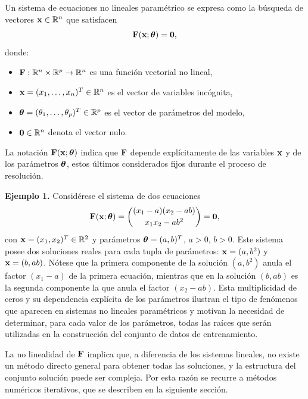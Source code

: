Un sistema de ecuaciones no lineales paramétrico se expresa como la búsqueda de vectores \(\mathbf{x} \in \mathbb{R}^n\) que satisfacen \begin{equation} \mathbf{F}(\mathbf{x}; \boldsymbol{\theta}) = \mathbf{0}, \label{eq:sistema_general} \end{equation} donde: \begin{itemize} \item \(\mathbf{F}: \mathbb{R}^n \times \mathbb{R}^p \to \mathbb{R}^n\) es una función vectorial no lineal, \item \(\mathbf{x} = (x_1, \dots, x_n)^T \in \mathbb{R}^n\) es el vector de variables incógnita, \item \(\boldsymbol{\theta} = (\theta_1, \dots, \theta_p)^T \in \mathbb{R}^p\) es el vector de parámetros del modelo, \item \(\mathbf{0} \in \mathbb{R}^n\) denota el vector nulo. \end{itemize} La notación \(\mathbf{F}(\mathbf{x}; \boldsymbol{\theta})\) indica que \(\mathbf{F}\) depende explícitamente de las variables \(\mathbf{x}\) y de los parámetros \(\boldsymbol{\theta}\), estos últimos considerados fijos durante el proceso de resolución.

\bigskip \noindent\textbf{Ejemplo 1.} Considérese el sistema de dos ecuaciones \[ \mathbf{F}(\mathbf{x}; \boldsymbol{\theta}) = \begin{pmatrix} (x_1 - a)(x_2 - ab) \\[2pt] x_1 x_2 - a b^2 \end{pmatrix} = \mathbf{0}, \] con \(\mathbf{x} = (x_1, x_2)^T \in \mathbb{R}^2\) y parámetros \(\boldsymbol{\theta} = (a, b)^T\), \(a > 0\), \(b > 0\). Este sistema posee dos soluciones reales para cada tupla de parámetros: \(\mathbf{x} = (a, b^2)\) y \(\mathbf{x} = (b, ab)\). Nótese que la primera componente de la solución \((a, b^2)\) anula el factor \((x_1 - a)\) de la primera ecuación, mientras que en la solución \((b, ab)\) es la segunda componente la que anula el factor \((x_2 - ab)\). Esta multiplicidad de ceros y su dependencia explícita de los parámetros ilustran el tipo de fenómenos que aparecen en sistemas no lineales paramétricos y motivan la necesidad de determinar, para cada valor de los parámetros, todas las raíces que serán utilizadas en la construcción del conjunto de datos de entrenamiento.

La no linealidad de \(\mathbf{F}\) implica que, a diferencia de los sistemas lineales, no existe un método directo general para obtener todas las soluciones, y la estructura del conjunto solución puede ser compleja. Por esta razón se recurre a métodos numéricos iterativos, que se describen en la siguiente sección.

